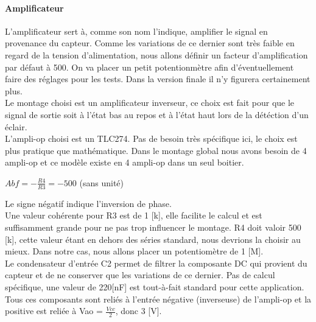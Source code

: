 \documentclass[a4paper,10pt]{article}
\begin{document}
\paragraph{Amplificateur}
L'amplificateur sert à, comme son nom l'indique, amplifier le signal en provenance du capteur. Comme les variations de ce dernier sont très faible en regard de la tension d'alimentation, nous allons définir un facteur d'amplification par défaut à 500. On va placer un petit potentionmètre afin d'éventuellement faire des réglages pour les tests. Dans la version finale il n'y figurera certainement plus. \\
Le montage choisi est un amplificateur inverseur, ce choix est fait pour que le signal de sortie soit à l'état bas au repos et à l'état haut lors de la détéction d'un éclair. \\
L'ampli-op choisi est un TLC274. Pas de besoin très spécifique ici, le choix est plus pratique que mathématique. Dans le montage global nous avons besoin de 4 ampli-op et ce modèle existe en 4 ampli-op dans un seul boitier.
\begin{center}
 $ Abf = -\frac{R4}{R3} = -500 $ (sans unité)
\end{center}
Le signe négatif indique l'inversion de phase. \\
Une valeur cohérente pour R3 est de 1 [k\ohm], elle facilite le calcul et est suffisamment grande pour ne pas trop influencer le montage. R4 doit valoir 500 [k\ohm], cette valeur étant en dehors des séries standard, nous devrions la choisir au mieux. Dans notre cas, nous allons placer un potentiomètre de 1 [M\ohm]. \\
Le condensateur d'entrée C2 permet de filtrer la composante DC qui provient du capteur et de ne conserver que les variations de ce dernier. Pas de calcul spécifique, une valeur de 220[nF] est tout-à-fait standard pour cette application. \\
Tous ces composants sont reliés à l'entrée négative (inverseuse) de l'ampli-op et la positive est reliée à Vao = $ \frac{Vcc}{2} $, donc 3 [V].
\end{document}
